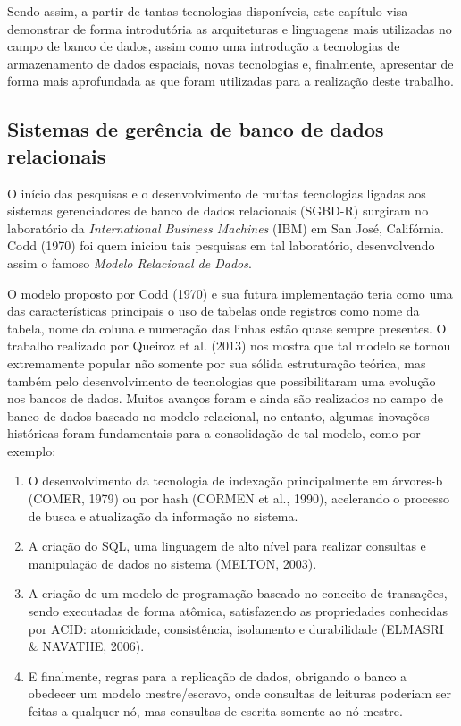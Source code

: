 		Sendo assim, a partir de tantas tecnologias disponíveis, este capítulo visa demonstrar de forma introdutória as arquiteturas e linguagens mais utilizadas no campo de banco de dados, assim como uma introdução a tecnologias de armazenamento de dados espaciais, novas tecnologias e, finalmente, apresentar de forma mais aprofundada as que foram utilizadas para a realização deste trabalho.
		
		\subsection{Sistemas de gerência de banco de dados relacionais}
		
		O início das pesquisas e o desenvolvimento de muitas tecnologias ligadas aos sistemas gerenciadores de banco de dados relacionais (SGBD-R) surgiram no laboratório da \textit{International Business Machines} (IBM) em San José, Califórnia. Codd (1970) foi quem iniciou tais pesquisas em tal laboratório, desenvolvendo assim o famoso \textit{Modelo Relacional de Dados}.
		
		O modelo proposto por Codd (1970) e sua futura implementação teria como uma das características principais o uso de tabelas onde registros como nome da tabela, nome da coluna e numeração das linhas estão quase sempre presentes. O trabalho realizado por Queiroz et al. (2013) nos mostra que tal modelo se tornou extremamente popular não somente por sua sólida estruturação teórica, mas também pelo desenvolvimento de tecnologias que possibilitaram uma evolução nos bancos de dados. Muitos avanços foram e ainda são realizados no campo de banco de dados baseado no modelo relacional, no entanto, algumas inovações históricas foram fundamentais para a consolidação de tal modelo, como por exemplo:
		
		\begin{enumerate}
			\item O desenvolvimento da tecnologia de indexação principalmente em árvores-b (COMER, 1979) ou por hash (CORMEN et al.,  1990), acelerando o processo de busca e atualização da informação no sistema.
			
			\item A criação do SQL, uma linguagem de alto nível para realizar consultas e manipulação de dados no sistema (MELTON, 2003).
			
			\item A criação de um modelo de programação baseado no conceito de transações, sendo executadas de forma atômica, satisfazendo as propriedades conhecidas por ACID: atomicidade, consistência, isolamento e durabilidade (ELMASRI \& NAVATHE, 2006).
			
			\item E finalmente, regras para a replicação de dados, obrigando o banco a obedecer um modelo mestre/escravo, onde consultas de leituras poderiam ser feitas a qualquer nó, mas consultas de escrita somente ao nó mestre.	
		\end{enumerate}
	
